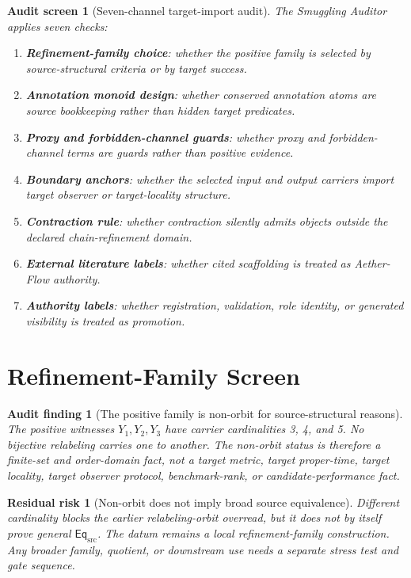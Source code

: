 \documentclass[11pt]{article}
\newcommand{\EqSrc}{\mathsf{Eq}_{\mathrm{src}}}
\newtheorem{auditscreen}{Audit screen}
\newtheorem{auditfinding}{Audit finding}
\newtheorem{residualrisk}{Residual risk}
\begin{document}
\begin{auditscreen}[Seven-channel target-import audit]
The Smuggling Auditor applies seven checks:
\begin{enumerate}
    \item \textbf{Refinement-family choice}: whether the positive family
    is selected by source-structural criteria or by target success.
    \item \textbf{Annotation monoid design}: whether conserved annotation
    atoms are source bookkeeping rather than hidden target predicates.
    \item \textbf{Proxy and forbidden-channel guards}: whether proxy and
    forbidden-channel terms are guards rather than positive evidence.
    \item \textbf{Boundary anchors}: whether the selected input and output
    carriers import target observer or target-locality structure.
    \item \textbf{Contraction rule}: whether contraction silently admits
    objects outside the declared chain-refinement domain.
    \item \textbf{External literature labels}: whether cited scaffolding
    is treated as Aether-Flow authority.
    \item \textbf{Authority labels}: whether registration, validation,
    role identity, or generated visibility is treated as promotion.
\end{enumerate}
\end{auditscreen}

\section{Refinement-Family Screen}

\begin{auditfinding}[The positive family is non-orbit for source-structural reasons]
The positive witnesses \(Y_{1},Y_{2},Y_{3}\) have carrier cardinalities
3, 4, and 5. No bijective relabeling carries one to another. The
non-orbit status is therefore a finite-set and order-domain fact, not a
target metric, target proper-time, target locality, target observer
protocol, benchmark-rank, or candidate-performance fact.
\end{auditfinding}

\begin{residualrisk}[Non-orbit does not imply broad source equivalence]
Different cardinality blocks the earlier relabeling-orbit overread, but
it does not by itself prove general \(\EqSrc\). The datum remains a local
refinement-family construction. Any broader family, quotient, or
downstream use needs a separate stress test and gate sequence.
\end{residualrisk}
\end{document}
